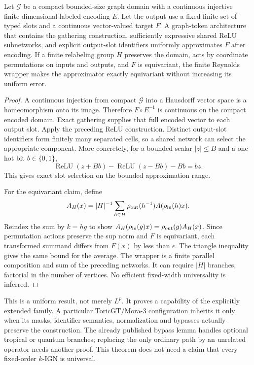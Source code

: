 \begin{theorem}
Let $\mathcal G$ be a compact bounded-size graph domain with a continuous injective finite-dimensional labeled encoding $E$. Let the output use a fixed finite set of typed slots and a continuous vector-valued target $F$. A graph-token architecture that contains the gathering construction, sufficiently expressive shared ReLU subnetworks, and explicit output-slot identifiers uniformly approximates $F$ after encoding. If a finite relabeling group $H$ preserves the domain, acts by coordinate permutations on inputs and outputs, and $F$ is equivariant, the finite Reynolds wrapper makes the approximator exactly equivariant without increasing its uniform error.
\end{theorem}
\begin{proof}
A continuous injection from compact $\mathcal G$ into a Hausdorff vector space is a homeomorphism onto its image. Therefore $F\circ E^{-1}$ is continuous on the compact encoded domain. Exact gathering supplies that full encoded vector to each output slot. Apply the preceding ReLU construction. Distinct output-slot identifiers form finitely many separated cells, so a shared network can select the appropriate component. More concretely, for a bounded scalar $|z|\le B$ and a one-hot bit $b\in\{0,1\}$,
\[
 \operatorname{ReLU}(z+Bb)-\operatorname{ReLU}(z-Bb)-Bb=bz.
\]
This gives exact slot selection on the bounded approximation range.

For the equivariant claim, define
\[
 A_H(x)=|H|^{-1}\sum_{h\in H}\rho_{\rm out}(h^{-1})
 A(\rho_{\rm in}(h)x).
\]
Reindex the sum by $k=hg$ to show $A_H(\rho_{\rm in}(g)x)=\rho_{\rm out}(g)A_H(x)$. Since permutation actions preserve the sup norm and $F$ is equivariant, each transformed summand differs from $F(x)$ by less than $\epsilon$. The triangle inequality gives the same bound for the average. The wrapper is a finite parallel composition and sum of the preceding networks. It can require $|H|$ branches, factorial in the number of vertices. No efficient fixed-width universality is inferred.
\end{proof}

This is a uniform result, not merely $L^p$. It proves a capability of the explicitly extended family. A particular ToricGT/Mora-3 configuration inherits it only when its masks, identifier semantics, normalization and bypasses actually preserve the construction. The already published bypass lemma handles optional tropical or quantum branches; replacing the only ordinary path by an unrelated operator needs another proof. This theorem does not need a claim that every fixed-order $k$-IGN is universal.

